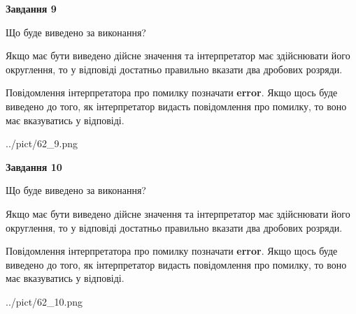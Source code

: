 \documentclass[12pt, ukrainian]{article}
\begin{document}
{\begin {Large}
{\begin {center}\textbf{Завдання 9}\end {center}}\par
Що буде виведено за виконання? \par

Якщо має бути виведено дійсне значення та інтерпретатор має здійснювати його округлення, 
то у відповіді достатньо правильно вказати два дробових розряди.

Повідомлення інтерпретатора про помилку позначати \textbf{error}.
Якщо щось буде виведено до того, як інтерпретатор видасть повідомлення про помилку, 
то воно має вказуватись у відповіді. \par

\begin{center}
	{../pict/62_9.png}
\end{center}
\newpage

{\begin {center}\textbf{Завдання 10}\end {center}}\par
Що буде виведено за виконання? \par

Якщо має бути виведено дійсне значення та інтерпретатор має здійснювати його округлення, 
то у відповіді достатньо правильно вказати два дробових розряди.

Повідомлення інтерпретатора про помилку позначати \textbf{error}.
Якщо щось буде виведено до того, як інтерпретатор видасть повідомлення про помилку, 
то воно має вказуватись у відповіді. \par

\begin{center}
	{../pict/62_10.png}
\end{center}
\newpage

\end {Large}}
\end{document}
